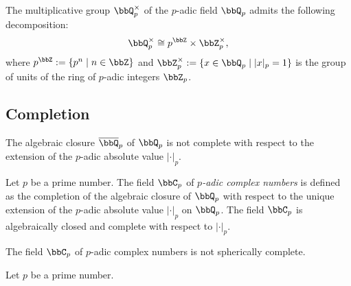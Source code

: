     \begin{proposition}\label{prop:group_structure_of_Q_p_times}
        The multiplicative group \(\bbQ_p^\times\) of the \(p\)-adic field \(\bbQ_p\) admits the following decomposition:
        \[ \bbQ_p^\times \cong p^\bbZ \times \bbZ_p^\times, \]
        where \(p^\bbZ := \{p^n \mid n \in \bbZ\}\) and \(\bbZ_p^\times := \{x \in \bbQ_p \mid |x|_p = 1\}\) is the group of units of the ring of \(p\)-adic integers \(\bbZ_p\).
    \end{proposition}


\subsection{Completion}

    \begin{proposition}\label{prop:algebraically_closure_of_Q_p_is_not_complete}
        The algebraic closure \(\overline{\bbQ}_p\) of \(\bbQ_p\) is not complete with respect to the extension of the \(p\)-adic absolute value \(|\cdot|_p\).
    \end{proposition}
    
    \begin{construction}\label{constr:p-adic_complex_number}
        Let \(p\) be a prime number.
        The field \(\bbC_p\) of \emph{\(p\)-adic complex numbers} is defined as the completion of the algebraic closure of \(\bbQ_p\) with respect to the unique extension of the \(p\)-adic absolute value \(|\cdot|_p\) on \(\bbQ_p\).
        The field \(\bbC_p\) is algebraically closed and complete with respect to \(|\cdot|_p\).
    \end{construction}

    \begin{proposition}\label{prop:C_p_is_not_spherically_complete}
        The field \(\bbC_p\) of \(p\)-adic complex numbers is not spherically complete.
    \end{proposition}

    \begin{construction}\label{constr:spherically_complete_p-adic_fields}
        Let \(p\) be a prime number.
    \end{construction}